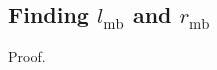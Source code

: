 \documentclass[twocolumn,aps,showpacs,showkeys,prd,superscriptaddress,byrevtex, amsmath]{revtex4-1}
\begin{document}
\begin{appendix}

\section{Finding $l_{\mathrm{mb}}$ and $r_{\mathrm{mb}}$}\label{ang_mom_appendix}
Proof.
\end{appendix}     
\end{document}
